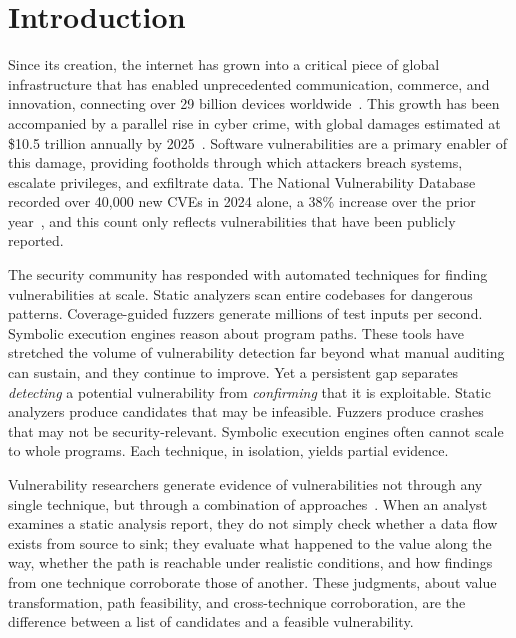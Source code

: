 \chapter{Introduction}
\label{ch:intro}

Since its creation, the internet has grown into a critical piece of global infrastructure that has enabled
unprecedented communication, commerce, and innovation, connecting over 29 billion devices worldwide~\cite{cisco2020air}.
This growth has been accompanied by a parallel rise in cyber crime, with global damages estimated at \$10.5 trillion annually by
2025~\cite{cybersecventures2025}.
Software vulnerabilities are a primary enabler of this damage, providing footholds through which attackers breach systems,
escalate privileges, and exfiltrate data.
The National Vulnerability Database recorded over 40,000 new CVEs in 2024 alone, a 38\% increase over the prior year~\cite{nvd2024stats},
and this count only reflects vulnerabilities that have been publicly reported.

The security community has responded with automated techniques for finding vulnerabilities at scale.
Static analyzers scan entire codebases for dangerous patterns.
Coverage-guided fuzzers generate millions of test inputs per second.
Symbolic execution engines reason about program paths.
These tools have stretched the volume of vulnerability detection far beyond what manual auditing can sustain,
and they continue to improve.
Yet a persistent gap separates \emph{detecting} a potential vulnerability from \emph{confirming} that it is exploitable.
Static analyzers produce candidates that may be infeasible.
Fuzzers produce crashes that may not be security-relevant.
Symbolic execution engines often cannot scale to whole programs.
Each technique, in isolation, yields partial evidence.

Vulnerability researchers generate evidence of vulnerabilities not through any single technique, but through a combination of approaches~\cite{votipka2018hackers}.
When an analyst examines a static analysis report, they do not simply check whether a data flow
exists from source to sink; they evaluate what happened to the value along the way, whether
the path is reachable under realistic conditions, and how findings from one technique corroborate
those of another.
These judgments, about value transformation, path feasibility, and cross-technique corroboration, are the
difference between a list of candidates and a feasible vulnerability.


